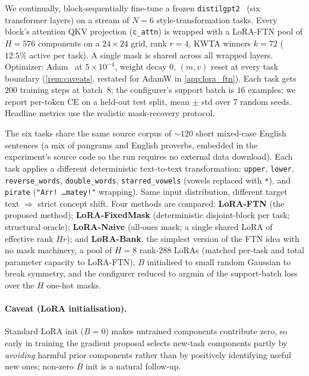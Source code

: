\documentclass{article}
\theoremstyle{plain}
\theoremstyle{remark}
\begin{document}
We continually, block-sequentially fine-tune a frozen \texttt{distilgpt2}~\citep{radford2019language,sanh2019distilbert,wolf2020transformers,huggingface_distilgpt2} (six transformer layers) on a stream of $N{=}6$ style-transformation tasks. Every block's attention QKV projection (\texttt{c\_attn}) is wrapped with a LoRA-FTN pool of $H{=}576$ components on a $24\times 24$ grid, rank $r{=}4$, KWTA winners $k{=}72$ ($12.5\%$ active per task). A single mask is shared across all wrapped layers. Optimizer: Adam~\citep{kingma2015adam} at $5\times 10^{-4}$, weight decay $0$, $(m,v)$ reset at every task boundary (\cref{rem:caveats}, restated for AdamW in \cref{app:lora_ftn}). Each task gets $200$ training steps at batch~$8$; the configurer's support batch is $16$ examples; we report per-token CE on a held-out test split, mean $\pm$ std over 7 random seeds. Headline metrics use the realistic mask-recovery protocol.

The six tasks share the same source corpus of $\sim\!120$ short mixed-case English sentences (a mix of pangrams and English proverbs, embedded in the experiment's source code so the run requires no external data download). Each task applies a different deterministic text-to-text transformation: \texttt{upper}, \texttt{lower}, \texttt{reverse\_words}, \texttt{double\_words}, \texttt{starred\_vowels} (vowels replaced with \texttt{*}), and \texttt{pirate} (\texttt{"Arr! \ldots matey!"} wrapping). Same input distribution, different target text $\Rightarrow$ strict concept shift. Four methods are compared: \textbf{LoRA-FTN} (the proposed method); \textbf{LoRA-FixedMask} (deterministic disjoint-block per task; structural oracle); \textbf{LoRA-Naive} (all-ones mask; a single shared LoRA of effective rank $Hr$); and \textbf{LoRA-Bank}, the simplest version of the FTN idea with no mask machinery, a pool of $H{=}8$ rank-$288$ LoRAs (matched per-task and total parameter capacity to LoRA-FTN), $B$ initialised to small random Gaussian to break symmetry, and the configurer reduced to argmin of the support-batch loss over the $H$ one-hot masks.

\paragraph{Caveat (LoRA initialisation).}
Standard LoRA init ($B{=}0$) makes untrained components contribute zero, so early in training the gradient proposal selects new-task components partly by \emph{avoiding} harmful prior components rather than by positively identifying useful new ones; non-zero $B$ init is a natural follow-up.
\end{document}
